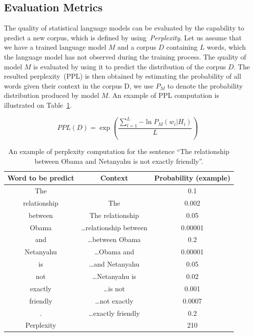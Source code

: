 \subsection{Evaluation Metrics}

The quality of statistical language models can be evaluated by the capability to predict a new corpus, which is defined by using~\textit{Perplexity}. Let us assume that we have a trained language model $M$ and a corpus $D$ containing $L$ words, which the language model has not observed during the training process. The quality of model $M$ is evaluated by using it to predict the distribution of the corpus $D$. The resulted perplexity~(PPL) is then obtained by estimating the probability of all words given their context in the corpus D, we use $P_M$ to denote the probability distribution produced by model $M$. An example of PPL computation is illustrated on Table~\ref{tab:examplePPL}.

\begin{equation}
\label{eq:ppl}
PPL(D) = \exp(\frac{\sum_{l=1}^L{-\ln P_M(w_i|H_i)}}{L}  )
\end{equation}


\begin{table}
	\centering
	\begin{tabular}{|c|c|c|}
	\hline
	Word to be predict & Context & Probability (example) \\
	\hline
	The & \starts & 0.1 \\
	relationship & \starts The & 0.002 \\
	between & \starts The relationship & 0.05 \\
	Obama & \starts \dots relationship between & 0.00001 \\
	and & \starts \dots between Obama & 0.2 \\
	Netanyahu & \starts \dots Obama and & 0.00001 \\
	is & \starts \dots and Netanyahu & 0.05 \\
	not & \starts \dots Netanyahu is & 0.02 \\
	exactly & \starts \dots is not & 0.001 \\
	friendly & \starts \dots not exactly & 0.0007 \\ 
	. & \starts \dots exactly friendly & 0.2 \\
	\hline
	Perplexity & & 210\\ 
	\hline
	\end{tabular}
	\label{tab:examplePPL}
\caption{An example of perplexity computation for the sentence ``The relationship between Obama and Netanyahu is not exactly friendly''.}
\end{table}

